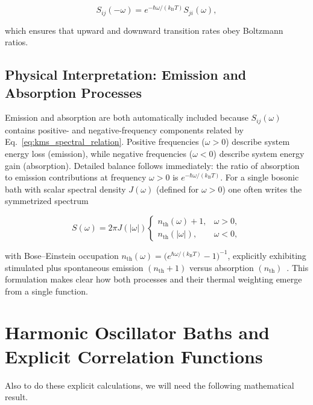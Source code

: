 \begin{equation}
	S_{ij}(-\omega) = e^{-\hbar\omega/(k_{\mathrm{B}} T)} S_{ji}(\omega),
	\label{eq:kms_spectral_relation}
\end{equation}

\noindent
which ensures that upward and downward transition rates obey Boltzmann ratios.

\subsection{Physical Interpretation: Emission and Absorption Processes}
\label{subsec:physical_emission_absorption}

\noindent
Emission and absorption are both automatically included because $S_{ij}(\omega)$ contains positive- and negative-frequency components related by Eq.~\eqref{eq:kms_spectral_relation}. Positive frequencies ($\omega>0$) describe system energy loss (emission), while negative frequencies ($\omega<0$) describe system energy gain (absorption). Detailed balance follows immediately: the ratio of absorption to emission contributions at frequency $\omega>0$ is $e^{-\hbar \omega/(k_{\mathrm{B}}T)}$. For a single bosonic bath with scalar spectral density $J(\omega)$ (defined for $\omega>0$) one often writes the symmetrized spectrum

\begin{equation}
	S(\omega) = 2\pi J(|\omega|) \begin{cases} n_{\text{th}}(\omega)+1, & \omega>0, \\ n_{\text{th}}(|\omega|), & \omega<0, \end{cases}
	\label{eq:bose_symmetric_spectrum}
\end{equation}

\noindent
with Bose--Einstein occupation $n_{\text{th}}(\omega) = \big(e^{\hbar\omega/(k_{\mathrm{B}}T)}-1\big)^{-1}$, explicitly exhibiting stimulated plus spontaneous emission $(n_{\text{th}}+1)$ versus absorption $(n_{\text{th}})$~\cite{weiss2012quantumdissipativesystems}. This formulation makes clear how both processes and their thermal weighting emerge from a single function.


\section{Harmonic Oscillator Baths and Explicit Correlation Functions}
\label{subsec:microscopic_bath_correlator}
Also to do these explicit calculations, we will need the following mathematical result.
